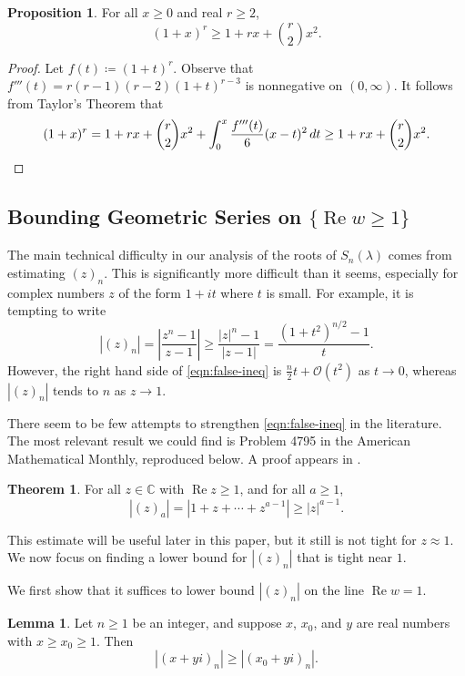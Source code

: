 \documentclass[11pt]{article}
\theoremstyle{definition}
\newtheorem{thm}{Theorem}
\newtheorem{lemma}{Lemma}
\newtheorem{prop}{Proposition}
\newcommand{\stern}[2]{S_{#1}(#2)}
\renewcommand{\Re}{\operatorname{Re}}
\newcommand{\lm}{\lambda}
\newcommand{\C}{\mathbb C}
\newcommand{\calO}{\mathcal O}
\newcommand{\abs}[1]{\left|#1\right|}
\begin{document}
\begin{prop}\label{prop:ineq-bernoulli}
	For all $x\geq 0$ and real $r \geq 2$, 
	\[
	(1+x)^r \geq 1 + rx + \binom r2 x^2.
	\]
\end{prop}
\begin{proof}
	Let $f(t) \coloneqq (1+t)^r$.  Observe that $f'''(t) = r(r-1)(r-2)(1+t)^{r-3}$ is nonnegative on $(0,\infty)$.  It follows from Taylor's Theorem that
	\[
	(1+x)^r = 1 + rx + \binom r2 x^2 + \int_0^x \frac{f'''(t)}6(x-t)^2\,dt \geq 1 + rx + \binom r2 x^2.\qedhere
	\]
\end{proof}

\subsection{Bounding Geometric Series on $\{\Re w \geq 1\}$}

The main technical difficulty in our analysis of the roots of $\stern n\lm$ comes from estimating $(z)_n$.  This is significantly more difficult than it seems, especially for complex numbers $z$ of the form $1 + it$ where $t$ is small.  For example, it is tempting to write
\begin{equation}\label{eqn:false-ineq}
	|(z)_n| = \abs{\frac{z^n-1}{z-1}} \geq \frac{|z|^n - 1}{|z-1|} = \frac{(1+t^2)^{n/2} - 1}t.
\end{equation}
However, the right hand side of \eqref{eqn:false-ineq} is $\tfrac n2 t + \calO(t^2)$ as $t\to 0$, whereas $|(z)_n|$ tends to $n$ as $z\to 1$.

There seem to be few attempts to strengthen \eqref{eqn:false-ineq} in the literature.  The most relevant result we could find is Problem 4795 in the American Mathematical Monthly, reproduced below.  A proof appears in \cite{AMM1962}.

\begin{thm}\label{thm:mitrinovic}
	For all $z\in\C$ with $\Re z \geq 1$, and for all $a \geq 1$,
	\[
	|(z)_a| = |1+z+\cdots + z^{a-1}| \geq |z|^{a-1}.
	\]
\end{thm}

This estimate will be useful later in this paper, but it still is not tight for $z\approx 1$.  We now focus on finding a lower bound for $|(z)_n|$ that is tight near $1$.

We first show that it suffices to lower bound $|(z)_n|$ on the line $\Re w = 1$.

\begin{lemma}\label{lemma:ineq-push-left}
	Let $n\geq 1$ be an integer, and suppose $x$, $x_0$, and $y$ are real numbers with $x\geq x_0\geq 1$.  Then
	\[
	|(x + yi)_n| \geq |(x_0 + yi)_n|.
	\]
\end{lemma}
\end{document}
